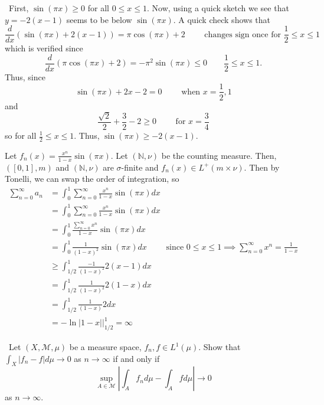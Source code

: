 \documentclass[12pt]{Qual}
\begin{document}
\begin{solution}$\,$
First, $\sin(\pi x)\ge 0$ for all $0\le x\le 1$. Now, using a quick sketch we see that $y=-2(x-1)$ seems to be below $\sin(\pi x)$. A quick check shows that $$\frac{d}{dx}(\sin(\pi x)+2(x-1))=\pi\cos(\pi x)+2\qquad\text{ changes sign once for }\frac{1}{2}\le x\le 1$$ which is verified since $$\frac{d}{dx}(\pi\cos(\pi x)+2)=-\pi^2\sin(\pi x)\le0\qquad\frac{1}{2}\le x\le 1.$$ Thus, since $$\sin(\pi x)+2x-2=0\qquad\text{ when }x=\frac{1}{2},1$$ and $$\frac{\sqrt{2}}{2}+\frac{3}{2}-2\ge 0\qquad\text{ for }x=\frac{3}{4}$$ so for all $\frac{1}{2}\le x\le 1$. Thus, $\sin(\pi x)\ge -2(x-1)$.

Let $f_n(x)=\frac{x^n}{1-x}\sin(\pi x)$.
Let $(\mathbb{N},\nu)$ be the counting measure.
Then, $([0,1],m)$ and $(\mathbb{N},\nu)$ are $\sigma$-finite and $f_n(x)\in L^+(m\times \nu)$. Then by Tonelli, we can swap the order of integration, so \begin{align*}
    \sum_{n=0}^\infty a_n&=\int_0^1\sum_{n=0}^\infty\frac{x^n}{1-x}\sin(\pi x)dx\\
    &=\int_0^1\sum_{n=0}^\infty\frac{x^n}{1-x}\sin(\pi x)dx\\
    &=\int_0^1\frac{\sum_{n=0}^\infty x^n}{1-x}\sin(\pi x)dx\\
    &=\int_0^1\frac{1}{(1-x)^2}\sin(\pi x)dx\qquad\text{ since }0\le x\le 1\implies \sum_{n=0}^\infty x^n=\frac{1}{1-x}\\
    &\ge\int_{1/2}^1\frac{-1}{(1-x)^2}2(x-1)dx\\
    &=\int_{1/2}^1\frac{1}{(1-x)^2}2(1-x)dx\\
    &=\int_{1/2}^1\frac{1}{(1-x)}2dx\\
    &=-\ln|1-x|\bigg|_{1/2}^1=\infty
\end{align*}
\end{solution}
\newpage

\begin{problem} $\,$
Let $(X,\mathscr{M},\mu)$ be a measure space, $f_n,f\in L^1(\mu)$. Show that $\int_X|f_n-f|d\mu\to0$ as $n\to\infty$ if and only if $$\sup_{A\in\mathscr{M}}\left|\int_Af_nd\mu-\int_Afd\mu\right|\to0$$ as $n\to\infty.$
\end{problem}
\end{document}
